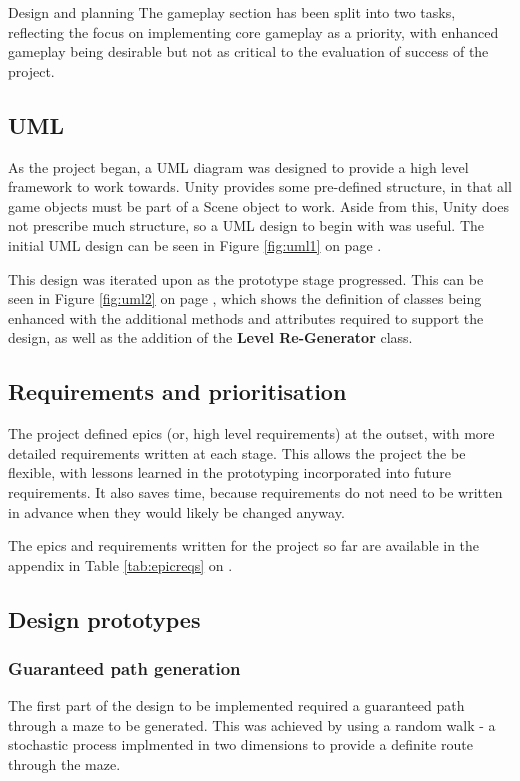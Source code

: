 \documentclass[progress]{cmpreport}
\begin{document}
\begin{section}{Design and planning}
The gameplay section has been split into two tasks, reflecting the focus on implementing core gameplay as a priority, with enhanced gameplay being desirable but not as critical to the evaluation of success of the project.


\subsection{UML}

As the project began, a UML diagram was designed to provide a high level framework to work towards. Unity provides some pre-defined structure, in that all game objects must be part of a Scene object to work. Aside from this, Unity does not prescribe much structure, so a UML design to begin with was useful. The initial UML design can be seen in Figure \ref{fig:uml1} on page \pageref{fig:uml1}.

This design was iterated upon as the prototype stage progressed. This can be seen in Figure \ref{fig:uml2} on page \pageref{fig:uml2}, which shows the definition of classes being enhanced with the additional methods and attributes required to support the design, as well as the addition of the \textbf{Level Re-Generator} class.


\subsection{Requirements and prioritisation}

The project defined epics (or, high level requirements) at the outset, with more detailed requirements written at each stage. This allows the project the be flexible, with lessons learned in the prototyping incorporated into future requirements. It also saves time, because requirements do not need to be written in advance when they would likely be changed anyway.

The epics and requirements written for the project so far are available in the appendix in Table \ref{tab:epicreqs} on \pageref{tab:epicreqs}.


\subsection{Design prototypes}
\subsubsection{Guaranteed path generation}
The first part of the design to be implemented required a guaranteed path through a maze to be generated. This was achieved by using a random walk - a stochastic process implmented in two dimensions to provide a definite route through the maze.


\end{section}
\end{document}
